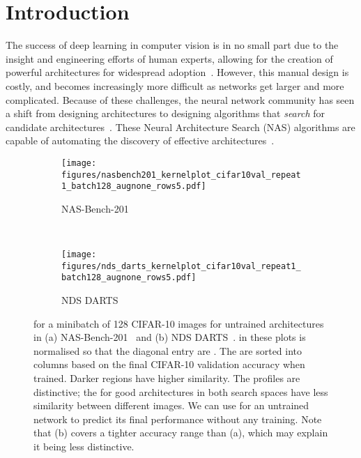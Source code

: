 \documentclass{article}
\newcommand{\maybebf}[0]{}
\begin{document}
\section{Introduction}
The success of deep learning in computer vision is in no small part due to the insight and engineering efforts of human experts, allowing for the creation of powerful architectures for widespread adoption~\citep{krizhevsky2012imagnet,simonyan2015very,he2016deep,szegedy2016rethinking,huang2017densely}. However, this manual design is costly, and becomes increasingly more difficult as networks get larger and more complicated. Because of these challenges, the neural network community has seen a shift from designing architectures to designing algorithms that {\it search} for candidate architectures~\citep{elsken2019neural,wistuba2019survey}. These Neural Architecture Search (NAS) algorithms are capable of automating the discovery of effective architectures~\citep{zoph2017neural,zoph2018learning,pham2018efficient,tan2019mnasnet,liu2019darts,real2019regularized}.

\begin{figure*}[!h]

\centering
    \begin{subfigure}{.475\textwidth}
    \texttt{[image: figures/nasbench201\_kernelplot\_cifar10val\_repeat1\_batch128\_augnone\_rows5.pdf]}
    \caption{NAS-Bench-201}
    \label{fig:activationhamming201}
    \end{subfigure}~
    \begin{subfigure}{.475\textwidth}
    \texttt{[image: figures/nds\_darts\_kernelplot\_cifar10val\_repeat1\_batch128\_augnone\_rows5.pdf]}
    \caption{NDS DARTS}
    \label{fig:activationhammingdarts}
    \end{subfigure}


\caption{{\color{black}  for a minibatch of 128 CIFAR-10 images for {\maybebf untrained} architectures in (a) NAS-Bench-201~\citep{Dong2020NAS-Bench-201} and (b) NDS DARTS~\citep{radosavovic2019network}.  in these plots is normalised so that the diagonal entry are . The  are sorted into columns based on the final CIFAR-10 validation accuracy {\maybebf when trained}. Darker regions have higher similarity. The profiles are distinctive; the  for good architectures in both search spaces have less similarity between different images. We can use  for an untrained network to predict its final performance without any training. Note that (b) covers a tighter accuracy range than (a), which may explain it being less distinctive.}}
    \label{fig:normhamming} 
\end{figure*}
\end{document}
